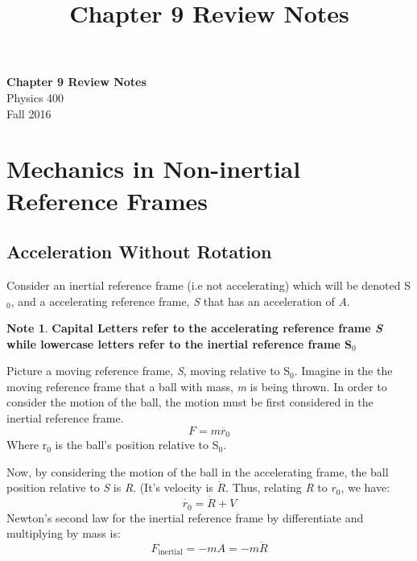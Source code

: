 \documentclass[11pt]{article}
\theoremstyle{definition}
\newtheorem{note}{Note}
\begin{document}
\setcounter{section}{8}
\title{Chapter 9 Review Notes}

\thispagestyle{empty}

\begin{center}
{\LARGE \bf Chapter 9 Review Notes}\\
{\large Physics 400}\\
Fall 2016
\end{center}
\section{Mechanics in Non-inertial Reference Frames}
\subsection{Acceleration Without Rotation}
Consider an inertial reference frame (i.e not accelerating) which will be denoted S$_0$, and a accelerating reference frame, \textit{S} that has an acceleration of \textit{A}. 
\begin{note}
\textbf{Capital Letters refer to the accelerating reference frame \textit{S} while lowercase letters refer to the inertial reference frame S$_0$}
\end{note}
Picture a moving reference frame, \textit{S}, moving relative to S$_0$. Imagine in the the moving reference frame that a ball with mass, \textit{m} is being thrown. 
In order to consider the motion of the ball, the motion must be first considered in the inertial reference frame. 
\begin{equation}
F = m\ddot{r_0}
\end{equation}
Where r$_0$ is the ball's position relative to S$_0$. 

Now, by considering the motion of the ball in the accelerating frame, the ball position relative to \textit{S} is \textit{R}. (It's velocity is $\dot{R}$. 
Thus, relating \textit{R} to $r_0$, we have: 
\begin{equation}
\dot{r_0} = \dot{R} + V
\end{equation}
Newton's second law for the inertial reference frame by differentiate and multiplying by mass is:
\begin{equation}
F_{\text{inertial}} = -mA = -m\ddot{R}
\end{equation}
\end{document}
